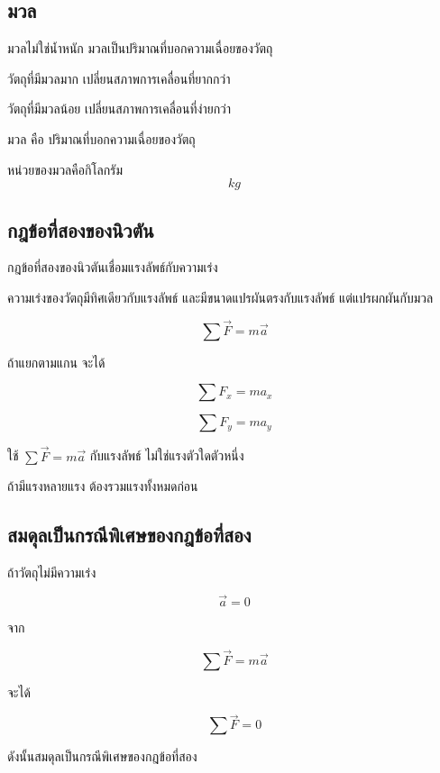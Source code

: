 \subsection{มวล}

มวลไม่ใช่น้ำหนัก มวลเป็นปริมาณที่บอกความเฉื่อยของวัตถุ

วัตถุที่มีมวลมาก เปลี่ยนสภาพการเคลื่อนที่ยากกว่า

วัตถุที่มีมวลน้อย เปลี่ยนสภาพการเคลื่อนที่ง่ายกว่า

\begin{tcolorbox}[title=นิยาม]
มวล คือ ปริมาณที่บอกความเฉื่อยของวัตถุ

หน่วยของมวลคือกิโลกรัม
\[
\si{kg}
\]
\end{tcolorbox}

\subsection{กฎข้อที่สองของนิวตัน}

กฎข้อที่สองของนิวตันเชื่อมแรงลัพธ์กับความเร่ง

\begin{tcolorbox}[title=กฎข้อที่สองของนิวตัน]
ความเร่งของวัตถุมีทิศเดียวกับแรงลัพธ์ และมีขนาดแปรผันตรงกับแรงลัพธ์ แต่แปรผกผันกับมวล

\[
\sum \vec{F}=m\vec{a}
\]
\end{tcolorbox}

ถ้าแยกตามแกน จะได้

\[
\sum F_x=ma_x
\]

\[
\sum F_y=ma_y
\]

\begin{tcolorbox}[title=ข้อควรจำ]
ใช้ $\sum \vec{F}=m\vec{a}$ กับแรงลัพธ์ ไม่ใช่แรงตัวใดตัวหนึ่ง

ถ้ามีแรงหลายแรง ต้องรวมแรงทั้งหมดก่อน
\end{tcolorbox}

\subsection{สมดุลเป็นกรณีพิเศษของกฎข้อที่สอง}

ถ้าวัตถุไม่มีความเร่ง

\[
\vec{a}=0
\]

จาก

\[
\sum \vec{F}=m\vec{a}
\]

จะได้

\[
\sum \vec{F}=0
\]

ดังนั้นสมดุลเป็นกรณีพิเศษของกฎข้อที่สอง

